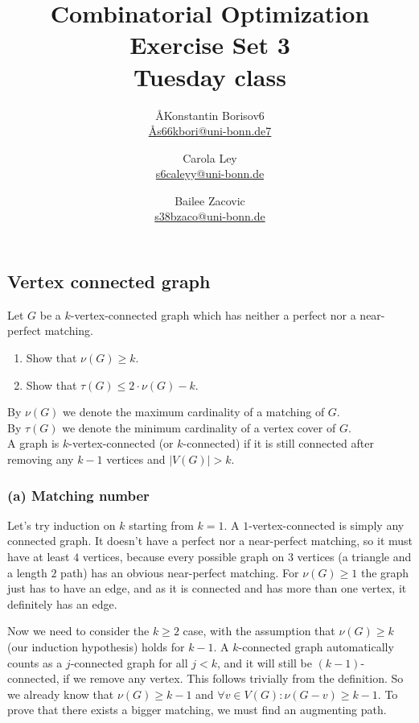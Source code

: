 \documentclass{article}
\title{Combinatorial Optimization \\ Exercise Set 3 \\ Tuesday class}
\author{
  \AA{Konstantin Borisov}{6} \\
  \href{mailto:\AA{s66kbori@uni-bonn.de}{7}}{\AA{s66kbori@uni-bonn.de}{7}}
  \and
  Carola Ley \\
  \href{mailto:s6caleyy@uni-bonn.de}{s6caleyy@uni-bonn.de}
  \and
  Bailee Zacovic \\
  \href{mailto:s38bzaco@uni-bonn.de}{s38bzaco@uni-bonn.de}
}
\begin{document}
  \maketitle

  \setcounter{section}{3}
  \subsection{Vertex connected graph}
  \begin{centerframebox}
    Let $G$ be a $k$-vertex-connected graph which has neither a perfect nor a near-perfect matching.

    \begin{enumerate}[label=(\alph*)]
      \item Show that $\nu(G) \geq k$.
      \item Show that $\tau(G) \leq 2 \cdot \nu(G) - k$.
    \end{enumerate}

    By $\nu(G)$ we denote the maximum cardinality of a matching of $G$. \\
    By $\tau(G)$ we denote the minimum cardinality of a vertex cover of $G$. \\
    A graph is $k$-vertex-connected (or $k$-connected) if it is still connected after removing any $k-1$ vertices and $|V(G)| > k$.
  \end{centerframebox}
  \subsubsection*{(a) Matching number}
  Let's try induction on $k$ starting from $k=1$.
  A $1$-vertex-connected is simply any connected graph.
  It doesn't have a perfect nor a near-perfect matching, so it must have at least $4$ vertices,
  because every possible graph on $3$ vertices (a triangle and a length $2$ path) has an obvious near-perfect matching.
  For $\nu(G) \geq 1$ the graph just has to have an edge, and as it is connected and has more than one vertex, it definitely has an edge.

  Now we need to consider the $k \geq 2$ case, with the assumption that $\nu(G) \geq k$ (our induction hypothesis) holds for $k-1$.
  A $k$-connected graph automatically counts as a $j$-connected graph for all $j < k$,
  and it will still be $(k-1)$-connected, if we remove any vertex.
  This follows trivially from the definition.
  So we already know that $\nu(G) \geq k-1$ and $\forall v \in V(G) : \nu(G - v) \geq k-1$.
  To prove that there exists a bigger matching, we must find an augmenting path.
\end{document}
